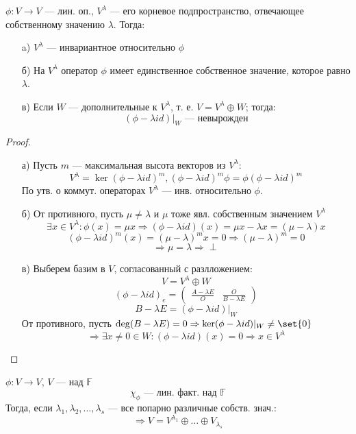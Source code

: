 \begin{theorem}
\label{theorem:05_2}
$\phi \colon V \rightarrow V$ --- лин. оп., $V^{\lambda}$ --- его корневое подпространство, отвечающее собственному значению $\lambda$. Тогда:
\begin{itemize}
  \item [a) ] $V^{\lambda}$ --- инвариантное относительно $\phi$
  \item [б) ] На $V^{\lambda}$ оператор $\phi$ имеет единственное собственное значение, которое равно $\lambda$.
  \item [в) ] Если $W$ --- дополнительные к $V^{\lambda}$, т. е.  $V = V^{\lambda} \oplus W$; тогда:
    \[
      (\phi - \lambda id)|_{W} \text{ --- невырожден}
    \]
\end{itemize}
\end{theorem}
\begin{proof}
  \begin{itemize}
    \item [а) ] Пусть $m$ --- максимальная высота векторов из $V^{\lambda}$:
      \[
      V^{\lambda} = \ker(\phi - \lambda id)^{m}, (\phi - \lambda id)^{m} \phi = \phi (\phi - \lambda id)^{m}
      \]
      По утв. о коммут. операторах $V^{\lambda}$ --- инв. относительно $\phi$.
    \item [б) ] От противного, пусть $\mu \neq \lambda$ и $\mu$ тоже явл. собственным значением $V^{\lambda}$
      \[
      \exists x \in V^{\lambda} \colon \phi(x) = \mu x \Rightarrow (\phi - \lambda id)(x) = \mu x - \lambda x = (\mu - \lambda) x 
      \]
      \[
        (\phi - \lambda id)^{m}(x) = (\mu - \lambda)^{m}x = 0 \Rightarrow (\mu - \lambda)^{m} = 0
      \]
      \[
       \Rightarrow \mu = \lambda \Rightarrow \perp
      \]
    \item [в) ] Выберем базим в $V$, согласованный с разлложением:
      \[
      V = V^{\lambda} \oplus W
      \]
      \[
        (\phi - \lambda id)_e = \begin{pmatrix} \frac{A - \lambda E}{O} & \frac{O}{B - \lambda E} \end{pmatrix}
      \]
      \[
      B - \lambda E = (\phi - \lambda id)|_{W}
      \]
      От противного, пусть $\deg (B - \lambda E) = 0 \Rightarrow \ker (\phi - \lambda id)|_{W} \neq \set{0}$
      \[
      \Rightarrow \exists x \neq 0 \in W\colon (\phi - \lambda id)(x) = 0 \Rightarrow x \in V^{\lambda}
      \]
  \end{itemize}
\end{proof}
\begin{theorem}
\label{theorem:05_3}
  $\phi \colon V \rightarrow V$, $V$ --- над $\mathbb{F}$
  \[
  \chi_\phi \text{ --- лин. факт. над $\mathbb{F}$}
  \]
  Тогда, если $\lambda_1, \lambda_2, \ldots, \lambda_s$ --- все попарно различные собств. знач.:
  \[
  \Rightarrow V = V^{\lambda_1} \oplus \ldots \oplus V_{\lambda_s}
  \]
\end{theorem}
